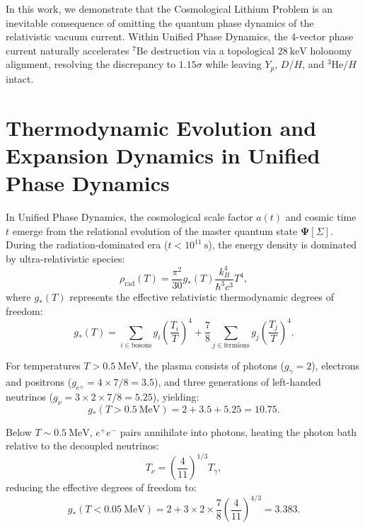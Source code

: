 \documentclass[11pt, a4paper]{article}
\theoremstyle{definition}
\theoremstyle{remark}
\begin{document}
In this work, we demonstrate that the Cosmological Lithium Problem is an inevitable consequence of omitting the quantum phase dynamics of the relativistic vacuum current. Within Unified Phase Dynamics, the 4-vector phase current naturally accelerates $^7\mathrm{Be}$ destruction via a topological $28~\mathrm{keV}$ holonomy alignment, resolving the discrepancy to $1.15\sigma$ while leaving $Y_p$, $D/H$, and $^3\mathrm{He}/H$ intact.

\section{Thermodynamic Evolution and Expansion Dynamics in Unified Phase Dynamics}

In Unified Phase Dynamics, the cosmological scale factor $a(t)$ and cosmic time $t$ emerge from the relational evolution of the master quantum state $\mathbf{\Psi}[\Sigma]$. During the radiation-dominated era ($t < 10^{11}~\mathrm{s}$), the energy density is dominated by ultra-relativistic species:
\begin{equation}
  \rho_{\mathrm{rad}}(T) = \frac{\pi^2}{30} g_*(T) \frac{k_B^4}{\hbar^3 c^3} T^4,
\end{equation}
where $g_*(T)$ represents the effective relativistic thermodynamic degrees of freedom:
\begin{equation}
  g_*(T) = \sum_{i \in \mathrm{bosons}} g_i \left(\frac{T_i}{T}\right)^4 + \frac{7}{8} \sum_{j \in \mathrm{fermions}} g_j \left(\frac{T_j}{T}\right)^4.
\end{equation}

For temperatures $T > 0.5~\mathrm{MeV}$, the plasma consists of photons ($g_\gamma = 2$), electrons and positrons ($g_{e^\pm} = 4 \times 7/8 = 3.5$), and three generations of left-handed neutrinos ($g_\nu = 3 \times 2 \times 7/8 = 5.25$), yielding:
\begin{equation}
  g_*(T > 0.5~\mathrm{MeV}) = 2 + 3.5 + 5.25 = 10.75.
\end{equation}

Below $T \sim 0.5~\mathrm{MeV}$, $e^+ e^-$ pairs annihilate into photons, heating the photon bath relative to the decoupled neutrinos:
\begin{equation}
  T_\nu = \left(\frac{4}{11}\right)^{1/3} T_\gamma,
\end{equation}
reducing the effective degrees of freedom to:
\begin{equation}
  g_*(T < 0.05~\mathrm{MeV}) = 2 + 3 \times 2 \times \frac{7}{8} \left(\frac{4}{11}\right)^{4/3} = 3.383.
\end{equation}
\end{document}
